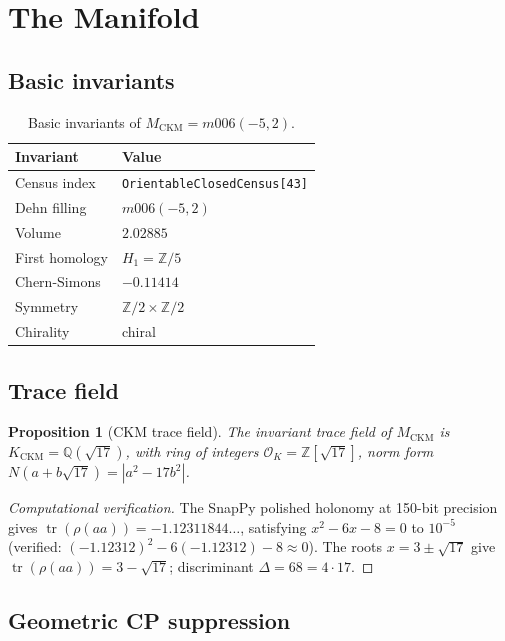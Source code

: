 \documentclass[11pt,a4paper]{article}
\newtheorem{proposition}{Proposition}
\begin{document}
\section{The Manifold}
\label{sec:manifold}

\subsection{Basic invariants}

\begin{table}[htbp]
\centering
\caption{Basic invariants of $M_{\mathrm{CKM}} = m006(-5,2)$.}
\label{tab:invariants}
\begin{tabular}{ll}
\toprule
Invariant & Value \\
\midrule
Census index & \texttt{OrientableClosedCensus[43]} \\
Dehn filling & $m006(-5,2)$ \\
Volume & $2.02885$ \\
First homology & $H_1 = \mathbb{Z}/5$ \\
Chern-Simons & $-0.11414$ \\
Symmetry & $\mathbb{Z}/2\times\mathbb{Z}/2$ \\
Chirality & chiral \\
\bottomrule
\end{tabular}
\end{table}

\subsection{Trace field}

\begin{proposition}[CKM trace field]
The invariant trace field of $M_{\mathrm{CKM}}$ is
$K_{\mathrm{CKM}} = \mathbb{Q}(\sqrt{17})$,
with ring of integers $\mathcal{O}_K = \mathbb{Z}[\sqrt{17}]$,
norm form $N(a+b\sqrt{17}) = |a^2-17b^2|$.
\end{proposition}

\begin{proof}[Computational verification]
The SnapPy polished holonomy at 150-bit precision gives
$\operatorname{tr}(\rho(aa)) = -1.12311844\ldots$,
satisfying $x^2-6x-8=0$ to $10^{-5}$
(verified: $(-1.12312)^2-6(-1.12312)-8\approx0$).
The roots $x=3\pm\sqrt{17}$ give
$\operatorname{tr}(\rho(aa))=3-\sqrt{17}$;
discriminant $\Delta=68=4\cdot17$.
\end{proof}

\subsection{Geometric CP suppression}
\end{document}

